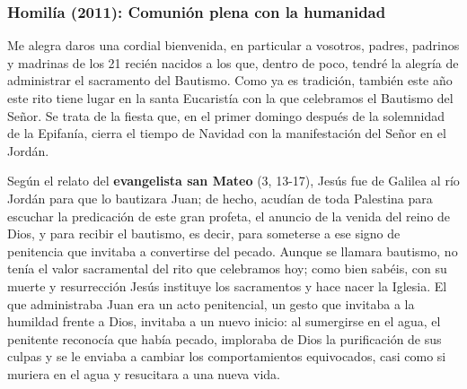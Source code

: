 			\subsubsection{Homilía (2011): Comunión plena con la humanidad}
			
				
				\begin{body}
					Me alegra daros una cordial bienvenida, en particular a vosotros, padres, padrinos y madrinas de los 21 recién nacidos a los que, dentro de poco, tendré la alegría de administrar el sacramento del Bautismo. Como ya es tradición, también este año este rito tiene lugar en la santa Eucaristía con la que celebramos el Bautismo del Señor. Se trata de la fiesta que, en el primer domingo después de la solemnidad de la Epifanía, cierra el tiempo de Navidad con la manifestación del Señor en el Jordán.
					
					Según el relato del \textbf{evangelista san Mateo} (3, 13-17), Jesús fue de Galilea al río Jordán para que lo bautizara Juan; de hecho, acudían de toda Palestina para escuchar la predicación de este gran profeta, el anuncio de la venida del reino de Dios, y para recibir el bautismo, es decir, para someterse a ese signo de penitencia que invitaba a convertirse del pecado. Aunque se llamara bautismo, no tenía el valor sacramental del rito que celebramos hoy; como bien sabéis, con su muerte y resurrección Jesús instituye los sacramentos y hace nacer la Iglesia. El que administraba Juan era un acto penitencial, un gesto que invitaba a la humildad frente a Dios, invitaba a un nuevo inicio: al sumergirse en el agua, el penitente reconocía que había pecado, imploraba de Dios la purificación de sus culpas y se le enviaba a cambiar los comportamientos equivocados, casi como si muriera en el agua y resucitara a una nueva vida.
					

\end{body}
